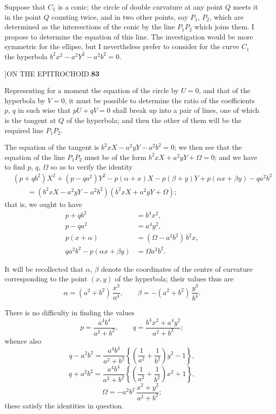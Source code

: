 \documentclass[11pt]{article}
\begin{document}
\hspace{1em} Suppose that $C_{1}$ is a conic; the circle of double curvature at
any point $Q$ meets it in the point $Q$ counting twice, and in two other
points, say $P_{1}$, $P_{2}$, which are determined as the intersections of the
conic by the line $P_{1}P_{2}$ which joins them. I propose to determine the
equation of this line. The investigation would be more symmetric for the
ellipse, but I nevertheless prefer to consider for the curve $C_{1}$ the
hyperbola $b^{2}x^{2}-a^{2}Y^{2}-a^{2}b^{2}=0$.

\newpage
{}]\hfill ON THE EPITROCHOID.\hfill\textbf{83}

\smallskip
\hspace{1em} Representing for a moment the equation of the circle by $U=0$, and
that of the hyperbola by $V=0$, it must be possible to determine the ratio of
the coefficients $p$, $q$ in such wise that $pU+qV=0$ shall break up into a
pair of lines, one of which is the tangent at $Q$ of the hyperbola; and then
the other of them will be the required line $P_{1}P_{2}$.

\hspace{1em} The equation of the tangent is $b^{2}xX-a^{2}yY-a^{2}b^{2}=0$; we
then see that the equation of the line $P_{1}P_{2}$ must be of the form
$b^{2}xX+a^{2}yY+\Omega=0$; and we have to find $p$, $q$, $\Omega$ so as to
verify the identity
\begin{align*}
&(p+qb^{2})X^{2}+(p-qa^{2})Y^{2}-p(\alpha+x)X-p(\beta+y)Y+p(\alpha x+\beta y)-qa^{2}b^{2}\\
&\qquad =(b^{2}xX-a^{2}yY-a^{2}b^{2})(b^{2}xX+a^{2}yY+\Omega);
\end{align*}
that is, we ought to have
\begin{align*}
p+qb^{2} &= b^{4}x^{2},\\
p-qa^{2} &= a^{4}y^{2},\\
p(x+\alpha) &= (\Omega-a^{2}b^{2})\,b^{2}x,\\
qa^{2}b^{2}-p(\alpha x+\beta y) &= \Omega a^{2}b^{2}.
\end{align*}

\hspace{1em} It will be recollected that $\alpha$, $\beta$ denote the
coordinates of the centre of curvature corresponding to the point $(x,y)$ of
the hyperbola; their values thus are
\[
\alpha=(a^{2}+b^{2})\,\frac{x^{3}}{a^{4}},\qquad
\beta=-(a^{2}+b^{2})\,\frac{y^{3}}{b^{4}}.
\]

\hspace{1em} There is no difficulty in finding the values
\[
p=\frac{a^{4}b^{4}}{a^{2}+b^{2}},\qquad q=\frac{b^{4}x^{2}+a^{4}y^{2}}{a^{2}+b^{2}};
\]
whence also
\[
q-a^{2}b^{2} = \frac{a^{4}b^{4}}{a^{2}+b^{2}}\!\left\{\!\left(\frac{1}{a^{2}}+\frac{1}{b^{2}}\right)y^{2}-1\right\}\!,
\]
\[
q+a^{2}b^{2} = \frac{a^{4}b^{4}}{a^{2}+b^{2}}\!\left\{\!\left(\frac{1}{a^{2}}+\frac{1}{b^{2}}\right)x^{2}+1\right\}\!,
\]
\[
\Omega = -a^{2}b^{2}\,\frac{x^{2}+y^{2}}{a^{2}+b^{2}};
\]
these satisfy the identities in question.
\end{document}
